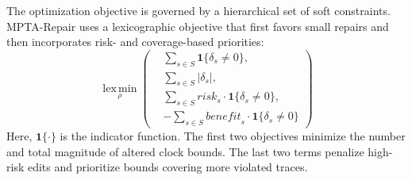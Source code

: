 The optimization objective is governed by a hierarchical set of soft
constraints. MPTA-Repair uses a lexicographic objective that first
favors small repairs and then incorporates risk- and coverage-based
priorities:
\begin{equation}
\operatorname*{lex\,min}_{\rho}
\left(
\begin{aligned}
  &\sum_{s\in S}\mathbf{1}\{\delta_s \ne 0\},\\
  &\sum_{s\in S}|\delta_s|,\\
  &\sum_{s\in S} \mathit{risk}_s \cdot \mathbf{1}\{\delta_s \ne 0\},\\
  &-\sum_{s\in S} \mathit{benefit}_s \cdot \mathbf{1}\{\delta_s \ne 0\}
\end{aligned}
\right)
\end{equation}
Here, $\mathbf{1}\{\cdot\}$ is the indicator function. The first two
objectives minimize the number and total magnitude of altered clock
bounds. The last two terms penalize high-risk edits and prioritize
bounds covering more violated traces.
